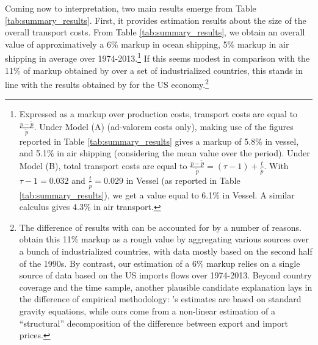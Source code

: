 \documentclass[a4paper,11pt]{article}
\begin{document}
Coming now to interpretation, two main results emerge from Table \ref{tab:summary_results}. First, it provides estimation results about the size of the overall transport costs. From Table \ref{tab:summary_results}, we obtain an overall value of approximatively a 6\% markup in ocean shipping, 5\% markup in air shipping in average over 1974-2013.\footnote{Expressed as a markup over production costs, transport costs are equal to $\frac{p-\widetilde{p}}{\widetilde{p}}$. Under Model (A) (ad-valorem costs only), making use of the figures reported in Table \ref{tab:summary_results} gives a markup of 5.8\% in vessel, and 5.1\% in air shipping (considering the mean value over the period). Under Model (B), total transport costs are equal to $\frac{p-\widetilde{p}}{\widetilde{p}} = (\tau-1) + \frac{t}{\widetilde{p}}$. With $\tau-1= 0.032$ and $\frac{t}{\widetilde{p}}= 0.029$ in Vessel (as reported in Table \ref{tab:summary_results}), we get a value equal to 6.1\% in Vessel. A similar calculus gives 4.3\% in air transport.} If this seems modest in comparison with the 11\% of markup obtained by \citet{anderson_wincoop_jel} over a set of industrialized countries, this stands in line with the results obtained by \citet{hummels2007} for the US economy.\footnote{The difference of results with \citet{anderson_wincoop_jel} can be accounted for by a number of reasons. \citet{anderson_wincoop_jel} obtain this 11\% markup as a rough value by aggregating various sources over a bunch of industrialized countries, with data mostly based on the second half of the 1990s. By contrast, our estimation of a 6\% markup relies on a single source of data based on the US imports flows over 1974-2013. Beyond country coverage and the time sample, another plausible candidate explanation lays in the difference of empirical methodology: \citet{anderson_wincoop_jel}'s estimates are based on standard gravity equations, while ours come from a non-linear estimation of a ``structural'' decomposition of the difference between export and import prices.}
\end{document}

